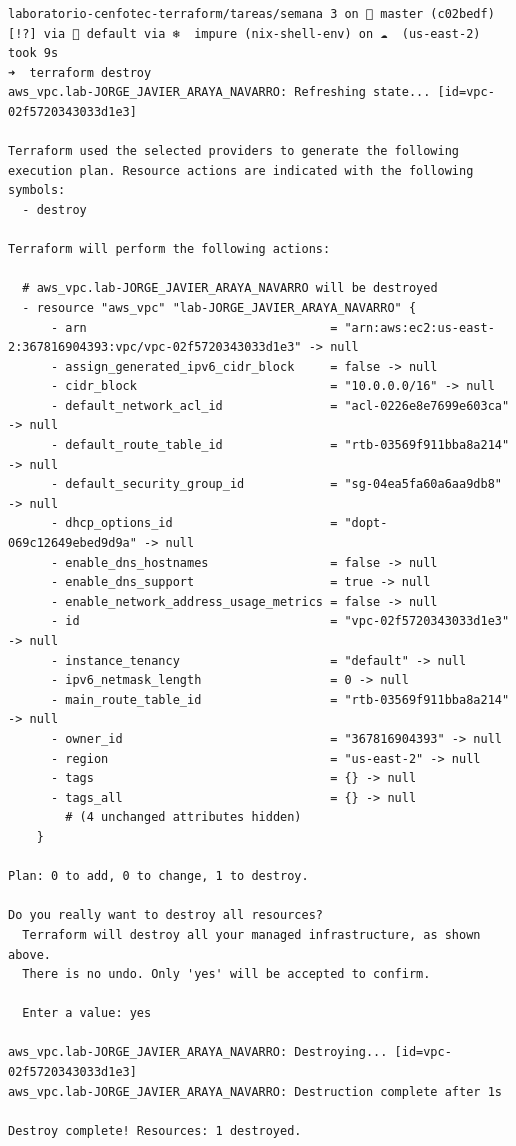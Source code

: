 \documentclass[11pt]{article}
\begin{document}
\begin{verbatim}
laboratorio-cenfotec-terraform/tareas/semana 3 on  master (c02bedf) [!?] via 💠 default via ❄  impure (nix-shell-env) on ☁  (us-east-2) took 9s
➜  terraform destroy
aws_vpc.lab-JORGE_JAVIER_ARAYA_NAVARRO: Refreshing state... [id=vpc-02f5720343033d1e3]

Terraform used the selected providers to generate the following execution plan. Resource actions are indicated with the following symbols:
  - destroy

Terraform will perform the following actions:

  # aws_vpc.lab-JORGE_JAVIER_ARAYA_NAVARRO will be destroyed
  - resource "aws_vpc" "lab-JORGE_JAVIER_ARAYA_NAVARRO" {
      - arn                                  = "arn:aws:ec2:us-east-2:367816904393:vpc/vpc-02f5720343033d1e3" -> null
      - assign_generated_ipv6_cidr_block     = false -> null
      - cidr_block                           = "10.0.0.0/16" -> null
      - default_network_acl_id               = "acl-0226e8e7699e603ca" -> null
      - default_route_table_id               = "rtb-03569f911bba8a214" -> null
      - default_security_group_id            = "sg-04ea5fa60a6aa9db8" -> null
      - dhcp_options_id                      = "dopt-069c12649ebed9d9a" -> null
      - enable_dns_hostnames                 = false -> null
      - enable_dns_support                   = true -> null
      - enable_network_address_usage_metrics = false -> null
      - id                                   = "vpc-02f5720343033d1e3" -> null
      - instance_tenancy                     = "default" -> null
      - ipv6_netmask_length                  = 0 -> null
      - main_route_table_id                  = "rtb-03569f911bba8a214" -> null
      - owner_id                             = "367816904393" -> null
      - region                               = "us-east-2" -> null
      - tags                                 = {} -> null
      - tags_all                             = {} -> null
        # (4 unchanged attributes hidden)
    }

Plan: 0 to add, 0 to change, 1 to destroy.

Do you really want to destroy all resources?
  Terraform will destroy all your managed infrastructure, as shown above.
  There is no undo. Only 'yes' will be accepted to confirm.

  Enter a value: yes

aws_vpc.lab-JORGE_JAVIER_ARAYA_NAVARRO: Destroying... [id=vpc-02f5720343033d1e3]
aws_vpc.lab-JORGE_JAVIER_ARAYA_NAVARRO: Destruction complete after 1s

Destroy complete! Resources: 1 destroyed.
\end{verbatim}
\end{document}
